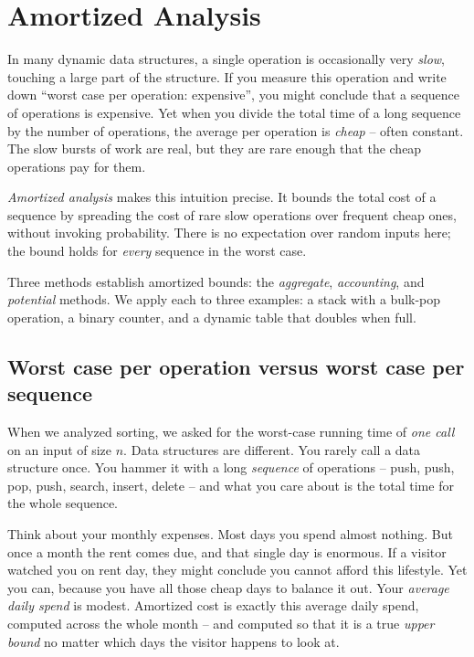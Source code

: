\chapter{Amortized Analysis}

In many dynamic data structures, a single operation is occasionally very \emph{slow}, touching a large part of the structure. If you measure this operation and write down ``worst case per operation: expensive'', you might conclude that a sequence of operations is expensive. Yet when you divide the total time of a long sequence by the number of operations, the average per operation is \emph{cheap} -- often constant. The slow bursts of work are real, but they are rare enough that the cheap operations pay for them.

\emph{Amortized analysis} makes this intuition precise. It bounds the total cost of a sequence by spreading the cost of rare slow operations over frequent cheap ones, without invoking probability. There is no expectation over random inputs here; the bound holds for \emph{every} sequence in the worst case.

Three methods establish amortized bounds: the \emph{aggregate}, \emph{accounting}, and \emph{potential} methods. We apply each to three examples: a stack with a bulk-pop operation, a binary counter, and a dynamic table that doubles when full.

\chapterline

\section{Worst case per operation versus worst case per sequence}

When we analyzed sorting, we asked for the worst-case running time of \emph{one call} on an input of size $n$. Data structures are different. You rarely call a data structure
once. You hammer it with a long \emph{sequence} of operations -- push, push, pop,
push, search, insert, delete -- and what you care about is the total time
for the whole sequence.

\begin{intuitionbox}
Think about your monthly expenses. Most days you spend almost nothing. But once a
month the rent comes due, and that single day is enormous. If a visitor watched
you on rent day, they might conclude you cannot afford this lifestyle. Yet you
can, because you have all those cheap days to balance it out. Your \emph{average
daily spend} is modest. Amortized cost is exactly this average daily spend,
computed across the whole month -- and computed so that it is a true
\emph{upper bound} no matter which days the visitor happens to look at.
\end{intuitionbox}

